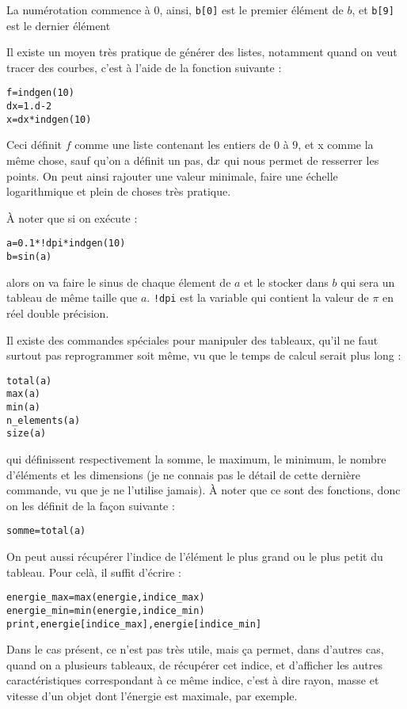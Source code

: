 \documentclass[a4paper,twoside]{article}
\begin{document}
\begin{attention}
La numérotation commence à $0$, ainsi, \verb|b[0]| est le premier élément de $b$, et \verb|b[9]| est le dernier élément
\end{attention}

\bigskip

Il existe un moyen très pratique de générer des listes, notamment quand on veut tracer des courbes, c'est à l'aide de la fonction suivante :
\begin{verbatim}
f=indgen(10)
dx=1.d-2
x=dx*indgen(10)
\end{verbatim}

Ceci définit $f$ comme une liste contenant les entiers de $0$ à $9$, et x comme la même chose, sauf qu'on a définit un pas, $\operatorname{d \!} x$ qui nous permet de resserrer les points. On peut ainsi rajouter une valeur minimale, faire une échelle logarithmique et plein de choses très pratique.

\begin{remarque}
À noter que si on exécute :
\begin{verbatim}
a=0.1*!dpi*indgen(10)
b=sin(a)
\end{verbatim}
alors on va faire le sinus de chaque élement de $a$ et le stocker dans $b$ qui sera un tableau de même taille que $a$. \verb|!dpi| est la variable qui contient la valeur de $\pi$ en réel double précision.
\end{remarque}


\bigskip

Il existe des commandes spéciales pour manipuler des tableaux, qu'il ne faut surtout pas reprogrammer soit même, vu que le temps de calcul serait plus long :
\begin{verbatim}
total(a)
max(a)
min(a)
n_elements(a)
size(a)
\end{verbatim}
qui définissent respectivement la somme, le maximum, le minimum, le nombre d'éléments et les dimensions (je ne connais pas le détail de cette dernière commande, vu que je ne l'utilise jamais). À noter que ce sont des fonctions, donc on les définit de la façon suivante :
\begin{verbatim}
somme=total(a)
\end{verbatim}

\begin{remarque}
On peut aussi récupérer l'indice de l'élément le plus grand ou le plus petit du tableau. Pour celà, il suffit d'écrire :
\begin{verbatim}
energie_max=max(energie,indice_max)
energie_min=min(energie,indice_min)
print,energie[indice_max],energie[indice_min]
\end{verbatim}

Dans le cas présent, ce n'est pas très utile, mais ça permet, dans d'autres cas, quand on a plusieurs tableaux, de récupérer cet indice, et d'afficher les autres caractéristiques correspondant à ce même indice, c'est à dire rayon, masse et vitesse d'un objet dont l'énergie est maximale, par exemple.
\end{remarque}
\end{document}
